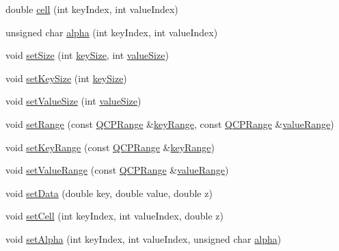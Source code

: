 \begin{DoxyCompactItemize}
double \hyperlink{class_q_c_p_color_map_data_af51ecd21f347adbf87b4cce4e1f5cbd6}{cell} (int key\+Index, int value\+Index)
\item 
unsigned char \hyperlink{class_q_c_p_color_map_data_a4f7e6b7a97017400cbbd46f0660e68ea}{alpha} (int key\+Index, int value\+Index)
\item 
void \hyperlink{class_q_c_p_color_map_data_a0d9ff35c299d0478b682bfbcdd9c097e}{set\+Size} (int \hyperlink{class_q_c_p_color_map_data_aa8d7811686fdfea964947715210c4af8}{key\+Size}, int \hyperlink{class_q_c_p_color_map_data_ab880be6bc587f34e8d22fe77ef6b57e9}{value\+Size})
\item 
void \hyperlink{class_q_c_p_color_map_data_ac7ef70e383aface34b44dbde49234b6b}{set\+Key\+Size} (int \hyperlink{class_q_c_p_color_map_data_aa8d7811686fdfea964947715210c4af8}{key\+Size})
\item 
void \hyperlink{class_q_c_p_color_map_data_a0893c9e3914513048b45e3429ffd16f2}{set\+Value\+Size} (int \hyperlink{class_q_c_p_color_map_data_ab880be6bc587f34e8d22fe77ef6b57e9}{value\+Size})
\item 
void \hyperlink{class_q_c_p_color_map_data_aad9c1c7c703c1339489fc730517c83d4}{set\+Range} (const \hyperlink{class_q_c_p_range}{Q\+C\+P\+Range} \&\hyperlink{class_q_c_p_color_map_data_a4765180639742460f64ab6c97c745c08}{key\+Range}, const \hyperlink{class_q_c_p_range}{Q\+C\+P\+Range} \&\hyperlink{class_q_c_p_color_map_data_a025be4d7ba0494fd7b38a5a56c737f2a}{value\+Range})
\item 
void \hyperlink{class_q_c_p_color_map_data_a0738c485f3c9df9ea1241b7a8bb6a86e}{set\+Key\+Range} (const \hyperlink{class_q_c_p_range}{Q\+C\+P\+Range} \&\hyperlink{class_q_c_p_color_map_data_a4765180639742460f64ab6c97c745c08}{key\+Range})
\item 
void \hyperlink{class_q_c_p_color_map_data_ada1b2680ba96a5f4175b6d341cf75d23}{set\+Value\+Range} (const \hyperlink{class_q_c_p_range}{Q\+C\+P\+Range} \&\hyperlink{class_q_c_p_color_map_data_a025be4d7ba0494fd7b38a5a56c737f2a}{value\+Range})
\item 
void \hyperlink{class_q_c_p_color_map_data_afd2083ccfd6987ec94aa7ef8e91ca39a}{set\+Data} (double key, double value, double z)
\item 
void \hyperlink{class_q_c_p_color_map_data_a8e75eaf8746596319032a93f3d2d0683}{set\+Cell} (int key\+Index, int value\+Index, double z)
\item 
void \hyperlink{class_q_c_p_color_map_data_aaf7de5b34c58f38d8f4c1ceb064a876c}{set\+Alpha} (int key\+Index, int value\+Index, unsigned char \hyperlink{class_q_c_p_color_map_data_a4f7e6b7a97017400cbbd46f0660e68ea}{alpha})

\end{DoxyCompactItemize}
